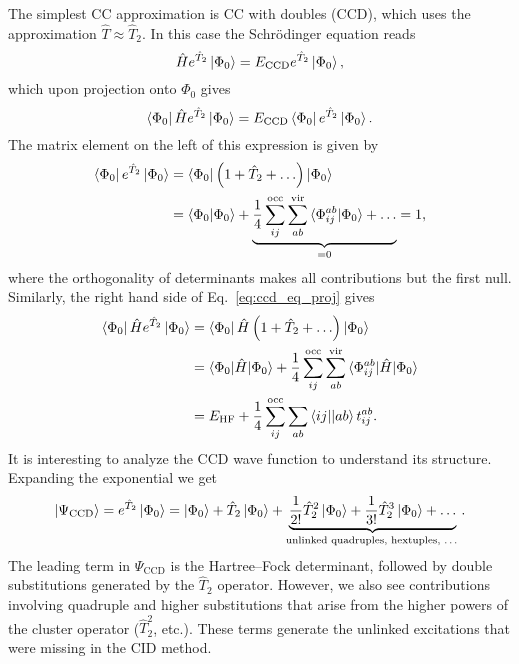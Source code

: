 \documentclass[../Main/chem532-notes.tex]{subfiles}
\begin{document}
The simplest CC approximation is CC with doubles (CCD), which uses the approximation $\hat{T} \approx \hat{T}_2$.
In this case the Schr{\"o}dinger equation reads
\begin{equation}
\hat{H} e^{\hat{T}_2}\ket{\Phi_0} = E_\mathrm{CCD} e^{\hat{T}_2}\ket{\Phi_0},
\end{equation}
which upon projection onto $\Phi_0$ gives
\begin{equation}
\label{eq:ccd_eq_proj}
\bra{\Phi_0}\hat{H} e^{\hat{T}_2}\ket{\Phi_0} = E_\mathrm{CCD} \bra{\Phi_0}e^{\hat{T}_2}\ket{\Phi_0}.
\end{equation}
The matrix element on the left of this expression is given by
\begin{equation}
\begin{split}
\bra{\Phi_0}e^{\hat{T}_2}\ket{\Phi_0} & = \bra{\Phi_0}\left(1 + \hat{T}_2 + \ldots\right)\ket{\Phi_0} \\
& =  \braket{\Phi_0 | \Phi_0} + \underbrace{ \frac{1}{4} \sum_{ij}^{\mathrm{occ}} \sum_{ab}^{\mathrm{vir}} \braket{\Phi_{ij}^{ab} | \Phi_0} + \ldots}_{= 0} = 1,
 \end{split}
\end{equation}
where the orthogonality of determinants makes all contributions but the first null.
Similarly, the right hand side of Eq.~\eqref{eq:ccd_eq_proj} gives
\begin{equation}
\begin{split}
\bra{\Phi_0}\hat{H}e^{\hat{T}_2}\ket{\Phi_0} & = \bra{\Phi_0}\hat{H}\left(1 + \hat{T}_2 + \ldots\right)\ket{\Phi_0} \\
& =  \braket{\Phi_0 | \hat{H} | \Phi_0} + \frac{1}{4} \sum_{ij}^{\mathrm{occ}} \sum_{ab}^{\mathrm{vir}} \braket{\Phi_{ij}^{ab} |\hat{H} | \Phi_0} \\
& = E_{\mathrm{HF}} + 
\frac{1}{4} \sum_{ij}^{\mathrm{occ}} \sum_{ab} \bra{ij}\!\ket{ab} t_{ij}^{ab}.
 \end{split}
\end{equation}
It is interesting to analyze the CCD wave function to understand its structure. Expanding the exponential we get
\begin{equation}
\ket{\Psi_{\mathrm{CCD}}} = e^{\hat{T}_2} \ket{\Phi_0}
= \ket{\Phi_0} + \hat{T}_2 \ket{\Phi_0} + \underbrace{\frac{1}{2!}\hat{T}_2^2\ket{\Phi_0} + \frac{1}{3!}\hat{T}_2^3\ket{\Phi_0} + \ldots}_{\text{unlinked quadruples, hextuples, \ldots}}. 
\end{equation}
The leading term in $\Psi_{\mathrm{CCD}}$ is the Hartree--Fock determinant, followed by double substitutions generated by the $\hat{T}_2$ operator. However, we also see contributions involving quadruple and higher substitutions that arise from the higher powers of the cluster operator ($\hat{T}_2^2$, etc.). These terms generate the unlinked excitations that were missing in the CID method.
\end{document}
